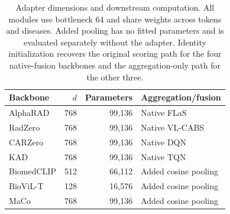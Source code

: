 \begin{table}[t]
\centering
\footnotesize
\setlength{\tabcolsep}{3.5pt}
\begin{tabular}{@{}lrrl@{}}
\toprule
Backbone & $d$ & Parameters & Aggregation/fusion \\
\midrule
AlphaRAD & 768 & 99,136 & Native FLaS \\
RadZero & 768 & 99,136 & Native VL-CABS \\
CARZero & 768 & 99,136 & Native DQN \\
KAD & 768 & 99,136 & Native TQN \\
BiomedCLIP & 512 & 66,112 & Added cosine pooling \\
BioViL-T & 128 & 16,576 & Added cosine pooling \\
MaCo & 768 & 99,136 & Added cosine pooling \\
\bottomrule
\end{tabular}
\caption{Adapter dimensions and downstream computation. All modules use bottleneck 64 and share weights across tokens and diseases. Added pooling has no fitted parameters and is evaluated separately without the adapter. Identity initialization recovers the original scoring path for the four native-fusion backbones and the aggregation-only path for the other three.}
\label{tab:token_mlp_backbones}
\end{table}
